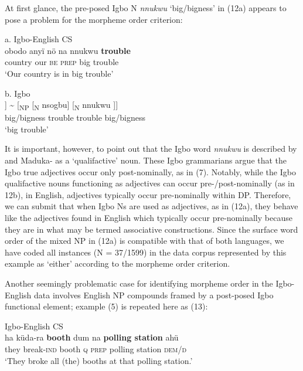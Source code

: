 \documentclass[output=paper]{langsci/langscibook}
\begin{document}
At first glance, the pre-posed Igbo N \textit{nnukwu }‘big/bigness’ in (12a) appears to pose a problem for the morpheme order criterion:

\ea
{a. Igbo-English CS}\\
\gll obodo  anyï  nö    na  nnukwu  \textbf{trouble}\\
     country  our    \textsc{be}\textsubscript{  }\textsc{prep} big     trouble\\
\glt ‘Our country is in big trouble’
\z

\ea
{b. Igbo }\\
\gll [\textsubscript{NP}\textsuperscript{ }[\textsubscript{N }nnukwu]  [\textsubscript{N }nsogbu]] {\textasciitilde} [\textsubscript{NP }[\textsubscript{N  }nsogbu] [\textsubscript{N }nnukwu\textsubscript{ }]]  \\
              big/bigness  trouble                  trouble       big/bigness    \\
\glt ‘big trouble’
\z

It is important, however, to point out that the Igbo word \textit{nnukwu }is described by \citet[47-8]{Emenanjo1978} and Maduka-\citet[237]{Durunze1990} as a ‘qualifactive’ noun. These Igbo grammarians argue that the Igbo true adjectives occur only post-nominally, as in (7). Notably, while the Igbo qualifactive nouns functioning as adjectives can occur pre-/post-nominally (as in 12b), in English, adjectives typically occur pre-nominally within DP. Therefore, we can submit that when Igbo Ns are used as adjectives, as in (12a), they behave like the adjectives found in English which typically occur pre-nominally because they are in what may be termed associative constructions. Since the surface word order of the mixed NP in (12a) is compatible with that of both languages, we have coded all instances (N = 37/1599) in the data corpus represented by this example as ‘either’ according to the morpheme order criterion. 

Another seemingly problematic case for identifying morpheme order in the Igbo-English data involves English NP compounds framed by a post-posed Igbo functional element; example (5) is repeated here as (13):

\ea
{Igbo-English CS}\\
\gll ha    küda-ra  \textbf{booth }dum   na    \textbf{polling station }ahü\\
     they break-\textsc{ind}  booth  \textsc{q}  \textsc{prep}  polling station   \textsc{dem/d}\\
\glt ‘They broke all (the) booths at that polling station.’ \textsubscript{ } 
\z
\end{document}

